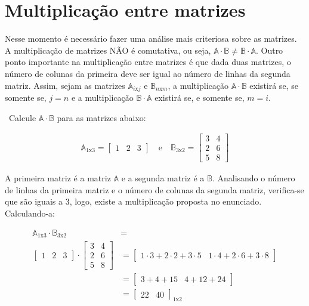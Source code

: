 \section{Multiplicação entre matrizes}

Nesse momento é necessário fazer uma análise mais criteriosa sobre as matrizes. A multiplicação de matrizes NÃO é comutativa, ou seja,
$\mathbb{A} \cdot \mathbb{B} \ne \mathbb{B} \cdot \mathbb{A}$. Outro ponto importante na multiplicação entre matrizes é que dada duas matrizes,
o número de colunas da primeira deve ser igual ao número de linhas da segunda matriz. Assim, sejam as matrizes $\mathbb{A}_{i\mathrm{x}j}$
e $\mathbb{B}_{n\mathrm{x}m}$, a multiplicação $\mathbb{A} \cdot \mathbb{B}$ existirá se, se somente se, $j=n$ e a multiplicação $\mathbb{B} \cdot \mathbb{A}$ existirá se, e somente se, $m=i$.
\begin{example}
	\video \, Calcule $\mathbb{A} \cdot \mathbb{B}$ para as matrizes abaixo:
	
	\begin{ceqn}
		\begin{align*}
			\mathbb{A}_{1\mathrm{x}3}=\begin{bmatrix}1 & 2 & 3\end{bmatrix}\quad\mathrm{e}\quad\mathbb{B}_{3\mathrm{x}2}=\begin{bmatrix}3 & 4\\
		2 & 6\\
		5 & 8
		\end{bmatrix}
		\end{align*}
	\end{ceqn}

	A primeira matriz é a matriz $\mathbb{A}$ e a segunda matriz é a $\mathbb{B}$. Analisando o número de linhas da primeira matriz e
	o número de colunas da segunda matriz, verifica-se que são iguais a 3, logo, existe a multiplicação proposta no enunciado. Calculando-a:
	
	
	\begin{ceqn}
		\begin{align*}
		\mathbb{A}_{1\mathrm{x}3}\cdot\mathbb{B}_{3\mathrm{x}2} & =\\
		\begin{bmatrix}1 & 2 & 3\end{bmatrix}\cdot\begin{bmatrix}3 & 4\\
		2 & 6\\
		5 & 8
		\end{bmatrix} & =  \begin{bmatrix}1\cdot3+2\cdot2+3\cdot5 & 1\cdot4+2\cdot6+3\cdot8\end{bmatrix}\\
		& =  \begin{bmatrix}3+4+15 & 4+12+24\end{bmatrix}\\
		& =  \begin{bmatrix}22 & 40\end{bmatrix}_{1\mathrm{x}2}
		\end{align*}
	\end{ceqn}
	

\end{example}
